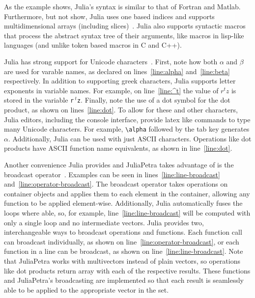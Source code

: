 \documentclass[acmsmall]{acmart}
\begin{document}
	As the example shows, Julia's syntax is similar to that of Fortran and Matlab.
	Furthermore, but not show, Julia uses one based indices and supports multidimensional arrays (including slices)~\cite{Bezanson:2017:FreshApproach}.
	Julia also supports syntactic macros that process the abstract syntax tree of their arguments, like macros in lisp-like languages (and unlike token based macros in C and C++).
	
	
	Julia has strong support for Unicode characters~\cite{Bezanson:2017:FreshApproach}.
	First, note how both \(\alpha\) and \(\beta\) are used for varable names, as declared on lines~\ref{line:alpha} and~\ref{line:beta} respectively.
	In addition to supporting greek characters, Julia supports letter exponents in variable names.
	For example, on line~\ref{line:^t} the value of \(r^tz\) is stored in the variable \texttt{r$\,^t$z}. %
	Finally, note the use of a dot symbol for the dot product, as shown on lines~\ref{line:dot}.
	To allow for these and other characters, Julia editors, including the console interface, provide latex like commands to type many Unicode characters.
	For example, \texttt{\textbackslash alpha} followed by the tab key generates \(\alpha\).
	Additionally, Julia can be used with just ASCII characters.
	Operations like dot products have ASCII function name equivalents, as shown in line~\ref{line:dot}.
	
	Another convenience Julia provides and JuliaPetra takes advantage of is the broadcast operator~\cite{Bezanson:2017:FreshApproach}.
	Examples can be seen in lines~\ref{line:line-broadcast} and~\ref{line:operator-broadcast}.
	The broadcast operator takes operations on container objects and applies them to each element in the container, allowing any function to be applied element-wise.
	Additionally, Julia automatically fuses the loops where able, so, for example, line~\ref{line:line-broadcast} will be computed with only a single loop and no intermediate vectors.
	Julia provides two, interchangeable ways to broadcast operations and functions.
	Each function call can broadcast individually, as shown on line~\ref{line:operator-broadcast}, or each function in a line can be broadcast, as shown on line~\ref{line:line-broadcast}.
	Note that JuliaPetra works with multivectors instead of plain vectors, so operations like dot products return array with each of the respective results.
	These functions and JuliaPetra's broadcasting are implemented so that each result is seamlessly able to be applied to the appropriate vector in the set.
	
\end{document}
